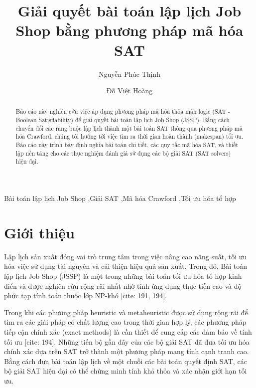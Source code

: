 \documentclass[a4paper,fleqn]{cas-sc} %
\begin{document}
\let\WriteBookmarks\relax
\def\floatpagepagefraction{1}
\def\textpagefraction{.001}

\title[mode = title]{Giải quyết bài toán lập lịch Job Shop bằng phương pháp mã hóa SAT}

\author[1]{Nguyễn Phúc Thịnh}
\author[1]{Đỗ Việt Hoàng}


\begin{abstract}
Báo cáo này nghiên cứu việc áp dụng phương pháp mã hóa thỏa mãn logic (SAT - Boolean Satisfiability) để giải quyết bài toán lập lịch Job Shop (JSSP). Bằng cách chuyển đổi các ràng buộc lập lịch thành một bài toán SAT thông qua phương pháp mã hóa Crawford, chúng tôi hướng tới việc tìm ra thời gian hoàn thành (makespan) tối ưu. Báo cáo này trình bày định nghĩa bài toán chi tiết, các quy tắc mã hóa SAT, và thiết lập nền tảng cho các thực nghiệm đánh giá sử dụng các bộ giải SAT (SAT solvers) hiện đại.
\end{abstract}

\begin{keywords}
Bài toán lập lịch Job Shop \sep Giải SAT \sep Mã hóa Crawford \sep Tối ưu hóa tổ hợp
\end{keywords}

\maketitle

\section{Giới thiệu}
Lập lịch sản xuất đóng vai trò trung tâm trong việc nâng cao năng suất, tối ưu hóa việc sử dụng tài nguyên và cải thiện hiệu quả sản xuất. Trong đó, Bài toán lập lịch Job Shop (JSSP) là một trong những bài toán tối ưu hóa tổ hợp kinh điển và được nghiên cứu rộng rãi nhất nhờ tính ứng dụng thực tiễn cao và độ phức tạp tính toán thuộc lớp NP-khó \cite{nguyen2026exact}[cite: 191, 194].

Trong khi các phương pháp heuristic và metaheuristic được sử dụng rộng rãi để tìm ra các giải pháp có chất lượng cao trong thời gian hợp lý, các phương pháp tiếp cận chính xác (exact methods) là cần thiết để cung cấp các đảm bảo về tính tối ưu \cite{nguyen2026exact}[cite: 194]. Những tiến bộ gần đây của các bộ giải SAT đã đưa tối ưu hóa chính xác dựa trên SAT trở thành một phương pháp mang tính cạnh tranh cao. Bằng cách đưa bài toán lập lịch về một chuỗi các bài toán quyết định SAT, các bộ giải SAT hiện đại có thể chứng minh tính khả thỏa và xác nhận giới hạn tối ưu.
\end{document}
